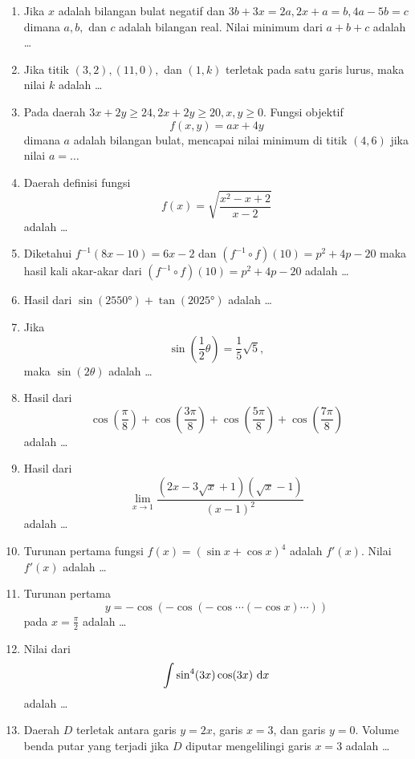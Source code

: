\begin{enumerate}
\item Jika $x$ adalah bilangan bulat negatif dan $3b+3x = 2a, 2x+a = b, 4a-5b = c$ dimana $a,b,$ dan $c$ adalah bilangan real. Nilai minimum dari $a+b+c$ adalah \ldots

\item Jika titik $(3,2), (11,0),$ dan $(1,k)$ terletak pada satu garis lurus, maka nilai $k$ adalah \ldots

\item Pada daerah $3x+2y \geq 24, 2x+2y\geq 20, x,y\geq 0$. Fungsi objektif $$f(x,y) = ax+4y$$ dimana $a$ adalah bilangan bulat, mencapai nilai minimum di titik $(4,6)$ jika nilai $a = \ldots$

\item Daerah definisi fungsi $$f(x) = \sqrt{\frac{x^2-x+2}{x-2}}$$ adalah \ldots

\item Diketahui $f^{-1}(8x-10) = 6x-2$ dan $(f^{-1} \circ f)(10) = p^2+4p-20$ maka hasil kali akar-akar dari $(f^{-1} \circ f)(10) = p^2+4p-20$ adalah \ldots

\item Hasil dari $\sin(\ang{2550}) + \tan(\ang{2025})$ adalah \ldots

\item Jika $${\displaystyle \sin\left(\frac{1}{2}\theta\right) = \frac{1}{5}\sqrt{5}},$$ maka $\sin(2\theta)$ adalah \ldots

\item Hasil dari $${\displaystyle \cos\left(\frac{\pi}{8}\right) + \cos\left(\frac{3\pi}{8}\right) + \cos\left(\frac{5\pi}{8}\right) + \cos\left(\frac{7\pi}{8}\right)}$$ adalah \ldots

\item Hasil dari $${\displaystyle \lim_{x\to1}\frac{(2x-3\sqrt{x}+1)(\sqrt{x}-1)}{(x-1)^2}}$$ adalah \ldots

\item Turunan pertama fungsi $f(x) = (\sin x + \cos x)^4$ adalah $f'(x)$. Nilai $f'(x)$ adalah \ldots

\item Turunan pertama $$y = -\cos(-\cos(-\cos\cdots(-\cos x)\cdots))$$ pada $x = \frac{\pi}{2}$ adalah \ldots

\item Nilai dari $$\int \sin^4(3x)\cos(3x) \text{ d}x$$ adalah \ldots

\item Daerah $D$ terletak antara garis $y=2x$, garis $x=3$, dan garis $y=0$. Volume benda putar yang terjadi jika $D$ diputar mengelilingi garis $x=3$ adalah \ldots


\end{enumerate}

